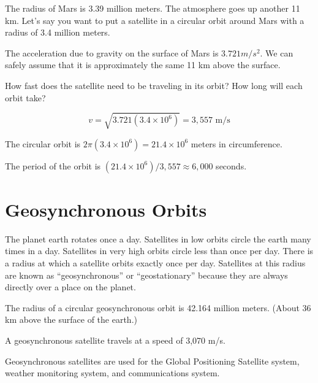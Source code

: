 \begin{Exercise}[title={Mars Orbit}, label=mars_orbit]
  
  The radius of Mars is 3.39 million meters. The atmosphere goes up
  another 11 km.  Let's say you want to put a satellite in a circular
  orbit around Mars with a radius of 3.4 million meters.

  The acceleration due to gravity on the surface of Mars is $3.721
  m/s^2$. We can safely assume that it is approximately the same 11 km
  above the surface.

  How fast does the satellite need to be traveling in its orbit?  How
  long will each orbit take?

\end{Exercise}
\begin{Answer}[ref=circular]
  $$v = \sqrt{3.721(3.4 \times 10^6)} = 3,557\text{ m/s}$$

  The circular orbit is $2\pi(3.4 \times 10^6) = 21.4 \times 10^6$ meters in circumference.

  The period of the orbit is $(21.4 \times 10^6)/3,557 \approx 6,000$ seconds.
\end{Answer}

\section{Geosynchronous Orbits}

The planet earth rotates once a day.  Satellites in low orbits circle
the earth many times in a day. Satellites in very high orbits circle
less than once per day. There is a radius at which a satellite orbits
exactly once per day.  Satellites at this radius are known as
``geosynchronous'' or ``geostationary'' because they are always
directly over a place on the planet.

The radius of a circular geosynchronous orbit is 42.164 million
meters. (About 36 km above the surface of the earth.)

A geosynchronous satellite travels at a speed of 3,070 m/s.

Geosynchronous satellites are used for the Global Positioning
Satellite system, weather monitoring system, and communications
system.




